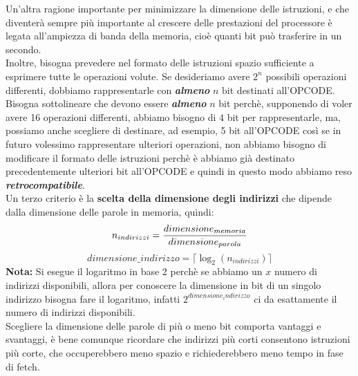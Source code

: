 \documentclass[12pt]{report}
\begin{document}
		Un'altra ragione importante per minimizzare la dimensione delle istruzioni, e che diventerà sempre più importante al crescere delle prestazioni del processore è legata all'ampiezza di banda della memoria, cioè quanti bit può trasferire in un secondo. \\
		Inoltre, bisogna prevedere nel formato delle istruzioni spazio sufficiente a esprimere tutte le operazioni volute. Se desideriamo avere $2^n$ possibili operazioni differenti, dobbiamo rappresentarle con \textbf{\textit{almeno}} $n$ bit destinati all'OPCODE.
		Bisogna sottolineare che devono essere \textbf{\textit{almeno}} $n$ bit perchè, supponendo di voler avere 16 operazioni differenti, abbiamo bisogno di 4 bit per rappresentarle, ma, possiamo anche scegliere di destinare, ad esempio, 5 bit all'OPCODE così se in futuro volessimo rappresentare ulteriori operazioni, non abbiamo bisogno di modificare il formato delle istruzioni perchè è abbiamo già destinato precedentemente ulteriori bit all'OPCODE e quindi in questo modo abbiamo reso \textit{\textbf{retrocompatibile}}.\\
		Un terzo criterio è la \textbf{scelta della dimensione degli indirizzi} che dipende dalla dimensione delle parole in memoria, quindi:
		\[
		n_{indirizzi} = \dfrac{dimensione_{memoria}}{dimensione_{parola}} \\
		\]
		\[
		dimensione\_indirizzo = \lceil \log_2 (n_{indirizzi}) \rceil
		\]
		\textbf{Nota:} Si esegue il logaritmo in base 2 perchè se abbiamo un $x$ numero di indirizzi disponibili, allora per conoscere la dimensione in bit di un singolo indirizzo bisogna fare il logaritmo, infatti $2^{dimensione_indirizzo}$ ci da esattamente il numero di indirizzi disponibili. \\
		Scegliere la dimensione delle parole di più o meno bit comporta vantaggi e svantaggi, è bene comunque ricordare che indirizzi più corti consentono istruzioni più corte, che occuperebbero meno spazio e richiederebbero meno tempo in fase di fetch.
\end{document}
